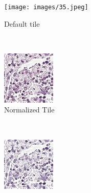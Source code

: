 \documentclass{l4proj}
\begin{document}
\begin{figure}[h] 
    \centering
    \begin{subfigure}[b]{0.2\textwidth}
        \texttt{[image: images/35.jpeg]}
        \caption{Default tile}
        \label{fig:default-tile}
    \end{subfigure}
    ~
    \begin{subfigure}[b]{0.2\textwidth}
        \includegraphics[width=\textwidth]{images/mnorm.jpeg}
        \caption{Normalized Tile}
        \label{fig:mnorm-tile}
    \end{subfigure}
    ~ %
    \begin{subfigure}[b]{0.2\textwidth}
        \includegraphics[width=\textwidth]{images/h.jpeg}

\end{subfigure}
\end{figure}
\end{document}
